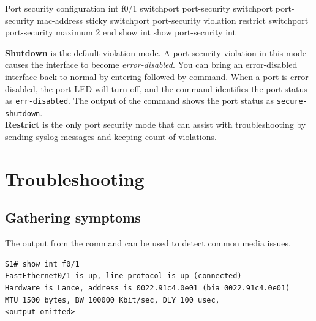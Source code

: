 %

\begin{sexylisting}{Port security configuration}
int f0/1
  switchport port-security
  switchport port-security mac-address sticky
  switchport port-security violation restrict
  switchport port-security maximum 2
end
show int  
show port-security int
\end{sexylisting}

\textbf{Shutdown} is the default violation mode. A port-security violation in this mode causes the interface to become \emph{error-disabled}. You can bring an error-disabled interface back to normal by entering  followed by  command. When a port is error-disabled, the port LED will turn off, and the  command identifies the port status as \verb|err-disabled|. The output of the  command shows the port status as \verb|secure-shutdown|.\\

\textbf{Restrict} is the only port security mode that can assist with troubleshooting by sending syslog messages and keeping count of violations.

\section{Troubleshooting}

\subsection{Gathering symptoms}

The output from the  command can be used to detect common media issues.

\begin{verbatim}
S1# show int f0/1
FastEthernet0/1 is up, line protocol is up (connected)
Hardware is Lance, address is 0022.91c4.0e01 (bia 0022.91c4.0e01)
MTU 1500 bytes, BW 100000 Kbit/sec, DLY 100 usec,
<output omitted>
\end{verbatim}

